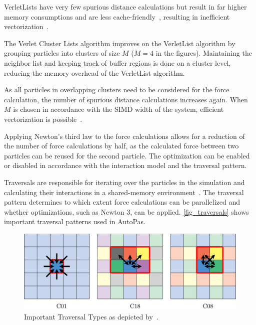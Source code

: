 \documentclass[conference]{IEEEtran}
\begin{document}
\begin{description}[style=nextline]
\begin{description}[style=nextline, font=\itshape\mdseries]
                VerletLists have very few spurious distance calculations but result in far higher memory consumptions and are less cache-friendly~\cite{Gratl2022AutoPas}, resulting in inefficient vectorization~\cite{PALL20132641}.

            \item[VerletClusterList]
                The Verlet Cluster Lists algorithm improves on the VerletList algorithm by grouping particles into clusters of size $M$ ($M=4$ in the figures). Maintaining the neighbor list and keeping track of buffer regions is done on a cluster level, reducing the memory overhead of the VerletList algorithm.

                As all particles in overlapping clusters need to be considered for the force calculation, the number of spurious distance calculations increases again. When $M$ is chosen in accordance with the SIMD width of the system, efficient vectorization is possible~\cite{Gratl2022AutoPas}.
        \end{description}


    \item[Newton 3]
        Applying Newton's third law to the force calculations allows for a reduction of the number of force calculations by half, as the calculated force between two particles can be reused for the second particle. The optimization can be enabled or disabled in accordance with the interaction model and the traversal pattern.

    \item[Traversal]
        Traversals are responsible for iterating over the particles in the simulation and calculating their interactions in a shared-memory environment~\cite{SECKLER2021101296}. The traversal pattern determines to which extent force calculations can be parallelized and whether optimizations, such as Newton 3, can be applied. \autoref{fig_traversals} shows important traversal patterns used in AutoPas.

        \begin{figure}[H]
            \centering
            \includegraphics[width=\columnwidth]{figures/traversals.jpg}
            \caption{Important Traversal Types as depicted by~\cite{NEWCOME2023115278}.}
            \label{fig_traversals}
        \end{figure}


\end{description}
\end{document}
